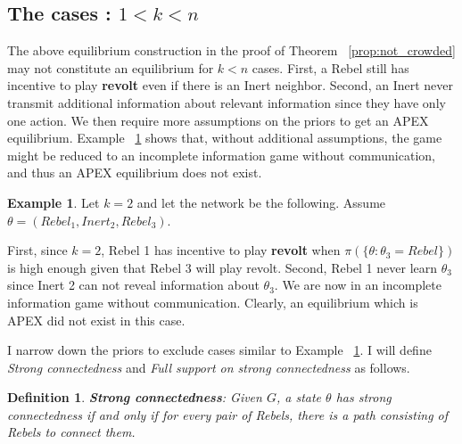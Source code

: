 \documentclass[12pt,letterpaper]{article}
\newtheorem*{main result}{Main Result}
\newtheorem{definition}{Definition}[section]
\theoremstyle{definition}
\newtheorem{example}{Example}[section]
\theoremstyle{remark}
\theoremstyle{claim}
\begin{document}
\subsection{The cases : $1<k<n$}

The above equilibrium construction in the proof of Theorem ~\ref{prop:not_crowded} may not constitute an equilibrium for $k<n$ cases. First, a Rebel still has incentive to play \textbf{revolt} even if there is an Inert neighbor. Second, an Inert never transmit additional information about relevant information since they have only one action. We then require more assumptions on the priors to get an APEX equilibrium. Example ~\ref{ex_strong_connectedness} shows that, without additional assumptions, the game might be reduced to an incomplete information game without communication, and thus an APEX equilibrium does not exist.

\begin{example}\label{ex_strong_connectedness}
Let $k=2$ and let the network be the following. Assume $\theta=(Rebel_1,Inert_2,Rebel_3)$.

\begin{center}
\end{center}

First, since $k=2$, Rebel 1 has incentive to play \textbf{revolt} when $\pi(\{\theta:\theta_3=Rebel\})$ is high enough given that Rebel 3 will play revolt. Second, Rebel 1 never learn $\theta_3$ since Inert 2 can not reveal information about $\theta_3$. We are now in an incomplete information game without communication. Clearly, an equilibrium which is APEX did not exist in this case.

\end{example}

I narrow down the priors to exclude cases similar  to Example ~\ref{ex_strong_connectedness}. I will define \textit{Strong connectedness} and \textit{Full support on strong connectedness} as follows.

\begin{definition}
\textbf{Strong connectedness}: Given $G$, a state $\theta$ has strong connectedness if and only if for every pair of Rebels, there is a path consisting of Rebels to connect them.
\end{definition}  
\end{document}
